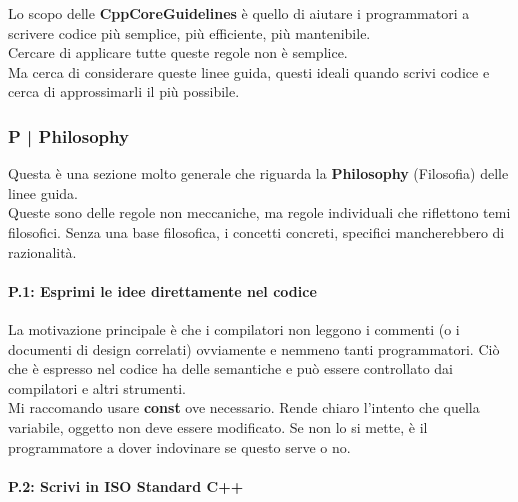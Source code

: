 \textsf{\small Lo scopo delle \textbf{CppCoreGuidelines} è quello di aiutare i programmatori a scrivere codice più semplice, più efficiente, più mantenibile.} \\

\textsf{\small Cercare di applicare tutte queste regole non è semplice.} \\

\textsf{\small Ma cerca di considerare queste linee guida, questi ideali quando scrivi codice e cerca di approssimarli il più possibile.} \break


\subsubsection{P | Philosophy}

\textsf{\small Questa è una sezione molto generale che riguarda la \textbf{Philosophy} (Filosofia) delle linee guida.} \\

\textsf{\small Queste sono delle regole non meccaniche, ma regole individuali che riflettono temi filosofici. Senza una base filosofica, i concetti concreti, specifici mancherebbero di razionalità.}

\paragraph{P.1: Esprimi le idee direttamente nel codice}

\textsf{\small La motivazione principale è che i compilatori non leggono i commenti (o i documenti di design correlati) ovviamente e nemmeno tanti programmatori. Ciò che è espresso nel codice ha delle semantiche e può essere controllato dai compilatori e altri strumenti.} \\

\textsf{\small Mi raccomando usare \textbf{const} ove necessario. Rende chiaro l'intento che quella variabile, oggetto non deve essere modificato. Se non lo si mette, è il programmatore a dover indovinare se questo serve o no.} \\

\paragraph{P.2: Scrivi in ISO Standard C++}

\label{P_2}

